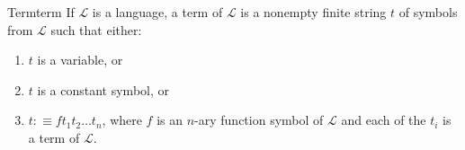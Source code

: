 \begin{definition}{Term}{term}
If $\mathcal{L}$ is a language, a term of $\mathcal{L}$ is a nonempty finite string $t$ of symbols from $\mathcal{L}$ such that either:
\begin{enumerate}
    \item $t$ is a variable, or
    \item $t$ is a constant symbol, or
    \item $t: \equiv f t_{1} t_{2} \ldots t_{n}$, where $f$ is an $n$-ary function symbol of $\mathcal{L}$ and each of the $t_{i}$ is a term of $\mathcal{L}$.
\end{enumerate}
\end{definition}
